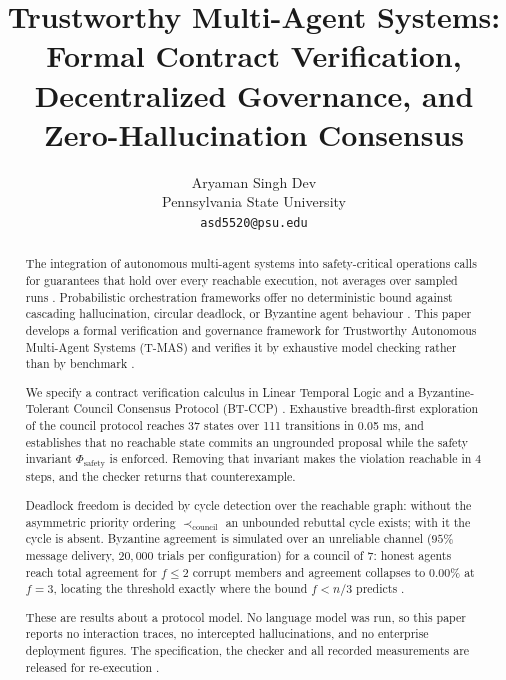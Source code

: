 \documentclass[10pt,twocolumn,letterpaper]{article}
\begin{document}
\title{Trustworthy Multi-Agent Systems: Formal Contract Verification, Decentralized Governance, and Zero-Hallucination Consensus}

\author{
Aryaman Singh Dev\\
Pennsylvania State University \\
\texttt{asd5520@psu.edu}
}

\maketitle

\begin{abstract}
The integration of autonomous multi-agent systems into safety-critical operations calls for guarantees that hold over every reachable execution, not averages over sampled runs \cite{arxiv_2005_14165,arxiv_2203_02155}. Probabilistic orchestration frameworks offer no deterministic bound against cascading hallucination, circular deadlock, or Byzantine agent behaviour \cite{arxiv_2312_03893,arxiv_2406_00584}. This paper develops a formal verification and governance framework for Trustworthy Autonomous Multi-Agent Systems (T-MAS) and verifies it by exhaustive model checking rather than by benchmark \cite{crossref_10_1109_access_2026_3656309}.

We specify a contract verification calculus in Linear Temporal Logic and a Byzantine-Tolerant Council Consensus Protocol (BT-CCP) \cite{crossref_10_1145_3689096_3689462}. Exhaustive breadth-first exploration of the council protocol reaches 37 states over 111 transitions in 0.05 ms, and establishes that no reachable state commits an ungrounded proposal while the safety invariant $\Phi_{\text{safety}}$ is enforced. Removing that invariant makes the violation reachable in 4 steps, and the checker returns that counterexample.

Deadlock freedom is decided by cycle detection over the reachable graph: without the asymmetric priority ordering $\prec_{\text{council}}$ an unbounded rebuttal cycle exists; with it the cycle is absent. Byzantine agreement is simulated over an unreliable channel ($95\%$ message delivery, $20{,}000$ trials per configuration) for a council of $7$: honest agents reach total agreement for $f \le 2$ corrupt members and agreement collapses to $0.00\%$ at $f = 3$, locating the threshold exactly where the bound $f < n/3$ predicts \cite{arxiv_2404_01131}.

These are results about a protocol model. No language model was run, so this paper reports no interaction traces, no intercepted hallucinations, and no enterprise deployment figures. The specification, the checker and all recorded measurements are released for re-execution \cite{arxiv_2501_02497,crossref_10_1201_9788743808145_14}.
\end{abstract}
\end{document}
